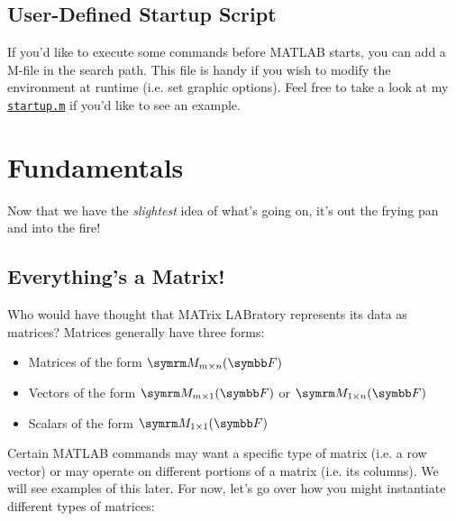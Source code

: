 \documentclass{article}
\begin{document}
\subsection{User-Defined Startup Script}

If you'd like to execute some commands before MATLAB starts, you can add
a  M-file in the search path.  This file is handy if you wish to
modify the environment at runtime (i.e. set graphic options).  Feel free
to take a look at my \href{https://github.com/jacobkoziej/dotfiles/%
blob/master/.config/matlab/startup.m}{\texttt{startup.m}} if you'd like
to see an example.

\section{Fundamentals}

Now that we have the \emph{slightest} idea of what's going on, it's out
the frying pan and into the fire!

\subsection{Everything's a Matrix!}

Who would have thought that MATrix LABratory represents its data as
matrices?  Matrices generally have three forms:

\begin{itemize}
	\item
		Matrices of the form \(\matrixField{m}{n}{F}\)

	\item
		Vectors of the form \(\matrixField{m}{1}{F}\) or
		\(\matrixField{1}{n}{F}\)

	\item
		Scalars of the form \(\matrixField{1}{1}{F}\)
\end{itemize}

\noindent
Certain MATLAB commands may want a specific type of matrix (i.e. a row
vector) or may operate on different portions of a matrix (i.e. its
columns).  We will see examples of this later.  For now, let's go over
how you might instantiate different types of matrices:

\inputminted{matlab}{01-matlab-at-a-glance.d/instantiate-matrix.m}
\end{document}
